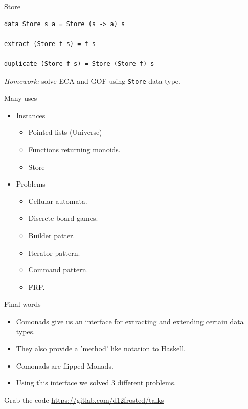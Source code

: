 \documentclass[presentation,aspectratio=169,smaller]{beamer}
\begin{document}
\begin{frame}[label={sec:orgdc6634b},fragile]{Store}
 \begin{verbatim}
data Store s a = Store (s -> a) s

extract (Store f s) = f s

duplicate (Store f s) = Store (Store f) s
\end{verbatim}

\pause

\emph{Homework:} solve ECA and GOF using \texttt{Store} data type.
\end{frame}

\begin{frame}[label={sec:orgd56d18b}]{Many uses}
\begin{itemize}
\item <1-> Instances
\begin{itemize}
\item Pointed lists (Universe)
\item Functions returning monoids.
\item Store
\end{itemize}
\item <2-> Problems
\begin{itemize}
\item Cellular automata.
\item Discrete board games.
\item Builder patter.
\item Iterator pattern.
\item Command pattern.
\item FRP.
\end{itemize}
\end{itemize}
\end{frame}

\begin{frame}[label={sec:orgc46c443}]{Final words}
\begin{itemize}
\item <1-> Comonads give us an interface for extracting and extending certain data
types.
\item <2-> They also provide a 'method' like notation to Haskell.
\item <3-> Comonads are flipped Monads.
\item <4-> Using this interface we solved 3 different problems.
\end{itemize}
\end{frame}

\begin{frame}[label={sec:org8ad1059}]{Grab the code}
\url{https://gitlab.com/d12frosted/talks}
\end{frame}
\end{document}
